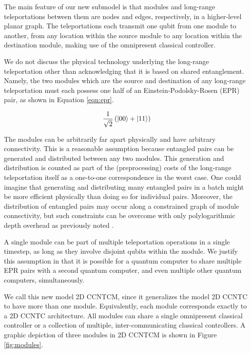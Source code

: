 The main feature of our new submodel is that modules
and long-range teleportations between them are nodes and edges, respectively,
in a higher-level planar graph. The teleportations each transmit one qubit
from one module to another, from any location within the source module
to any location within the destination module, making use of the
omnipresent classical controller.

We do not discuss the physical technology underlying the long-range
teleportation other than acknowledging that it is based on shared
entanglement. Namely, the two modules which are the source and destination
of any long-range teleportation must each possess one half of an
Einstein-Podolsky-Rosen (EPR) pair, as shown in Equation \ref{eqn:epr}.

\begin{equation}
\frac{1}{\sqrt{2}} \left( \left\vert{00}\right\rangle + \left\vert{11}\right\rangle \right)
\label{eqn:epr}
\end{equation}


 The modules can be arbitrarily far
apart physically and have arbitrary connectivity. This is a reasonable
assumption because entangled pairs can be generated and distributed between
any two modules. This generation and distribution is counted as part of
the (preprocessing) costs of the long-range teleportation itself as a
one-to-one correspondence in the worst case. One could imagine that 
generating and distributing many entangled pairs in a batch might be more
efficient physically than doing so for individual pairs. Moreover, the
distribution of entangled pairs may occur along a constrained graph of
module connectivity, but such constraints can be overcome with only
polylogarithmic depth overhead as previously noted \cite{Beals2012}.

A single module can be part of multiple teleportation operations in a single
timestep, as long as they involve disjoint qubits within the module.
We justify this assumption in that it is
possible for a quantum computer to share multiple EPR pairs with a
second quantum computer, and even multiple other quantum computers,
simultaneously.

We call this new model \textsf{2D CCNTCM}, since it generalizes the
model \textsf{2D CCNTC} to have more than one module. Equivalently,
each module corresponds exactly to a \textsf{2D CCNTC} architecture.
All modules can share a single omnipresent
classical controller or a collection of multiple, inter-communicating classical controllers.
A graphic depiction of three modules in \textsf{2D CCNTCM} is shown in
Figure \ref{fig:modules}.

